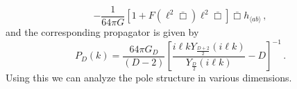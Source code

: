 \documentclass[11pt]{article}
\begin{document}
{%
\begin{equation}
-\frac{1}{64\pi G}\left[1+ F\left(\ell^2\bar \Box\right) \ell^2 \bar \Box\right]\bar \Box h_{\langle ab \rangle}\, ,%
\end{equation}
and the corresponding propagator is given by
%
\begin{equation}\displaystyle
P_{D}(k)=\frac{64\pi G_{D}}{(D-2) } \left[\frac{i \ell k Y_{\frac{D+2}{2}}(i \ell k)}{Y_{\frac{D}{2}}(i \ell k)}-D\right]^{-1}\, .
\end{equation}
Using this we can analyze the pole structure in various dimensions.

}
\end{document}
